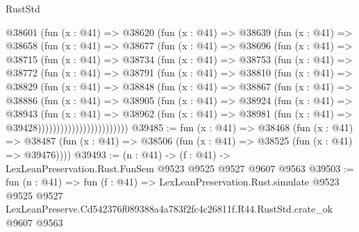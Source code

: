 \begin{lexlean}{RustStd}
\begin{coremodule}
        @38601
          (fun (x : @41) =>
          @38620
            (fun (x : @41) =>
            @38639
              (fun (x : @41) =>
              @38658
                (fun (x : @41) =>
                @38677
                  (fun (x : @41) =>
                  @38696
                    (fun (x : @41) =>
                    @38715
                      (fun (x : @41) =>
                      @38734
                        (fun (x : @41) =>
                        @38753
                          (fun (x : @41) =>
                          @38772
                            (fun (x : @41) =>
                            @38791
                              (fun (x : @41) =>
                              @38810
                                (fun (x : @41) =>
                                @38829
                                  (fun (x : @41) =>
                                  @38848
                                    (fun (x : @41) =>
                                    @38867
                                      (fun (x : @41) =>
                                      @38886
                                        (fun (x : @41) =>
                                        @38905
                                          (fun (x : @41) =>
                                          @38924
                                            (fun (x : @41) =>
                                            @38943
                                              (fun (x : @41) =>
                                              @38962
                                                (fun (x : @41) =>
                                                @38981
                                                  (fun (x : @41) => @39428))))))))))))))))))))))))
@39485 := fun (x : @41) =>
  @38468
    (fun (x : @41) =>
    @38487 (fun (x : @41) => @38506 (fun (x : @41) => @38525 (fun (x : @41) => @39476))))
@39493 := (n : @41) -> (f : @41) -> LexLeanPreservation.Rust.FunSem @9523 @9525 @9527 @9607 @9563
@39503 := fun (n : @41) =>
  fun (f : @41) =>
  LexLeanPreservation.Rust.simulate
    @9523
    @9525
    @9527
    LexLeanPreserve.Cd542376f089388a4a783f2fc4c26811f.R44.RustStd.crate_ok
    @9607
    @9563
\end{coremodule}
\end{lexlean}
